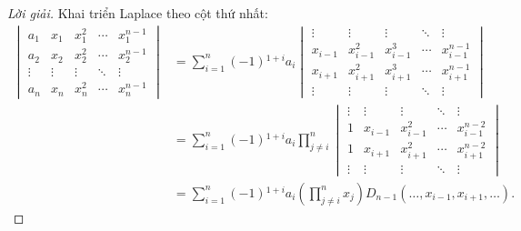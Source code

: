 \begin{proof}[Lời giải]
    Khai triển Laplace theo cột thứ nhất:
    \begin{align*}
        \begin{vmatrix}
            a_{1}  & x_{1}  & x_{1}^{2} & \cdots & x_{1}^{n-1} \\
            a_{2}  & x_{2}  & x_{2}^{2} & \cdots & x_{2}^{n-1} \\
            \vdots & \vdots & \vdots    & \ddots & \vdots      \\
            a_{n}  & x_{n}  & x_{n}^{2} & \cdots & x_{n}^{n-1}
        \end{vmatrix}
         & =
        \sum^{n}_{i=1}(-1){}^{1+i}a_{i}
        \begin{vmatrix}
            \vdots  & \vdots      & \vdots      & \ddots & \vdots        \\
            x_{i-1} & x_{i-1}^{2} & x_{i-1}^{3} & \cdots & x_{i-1}^{n-1} \\
            x_{i+1} & x_{i+1}^{2} & x_{i+1}^{3} & \cdots & x_{i+1}^{n-1} \\
            \vdots  & \vdots      & \vdots      & \ddots & \vdots
        \end{vmatrix} \\
         & =
        \sum^{n}_{i=1}(-1){}^{1+i}a_{i}\prod^{n}_{j\ne i}
        \begin{vmatrix}
            \vdots & \vdots  & \vdots      & \ddots & \vdots        \\
            1      & x_{i-1} & x_{i-1}^{2} & \cdots & x_{i-1}^{n-2} \\
            1      & x_{i+1} & x_{i+1}^{2} & \cdots & x_{i+1}^{n-2} \\
            \vdots & \vdots  & \vdots      & \ddots & \vdots
        \end{vmatrix}      \\
         & =
        \sum^{n}_{i=1}(-1){}^{1+i}a_{i}\left(\prod^{n}_{j\ne i}x_{j}\right)
        D_{n-1}(\ldots, x_{i-1}, x_{i+1}, \ldots).
    \end{align*}
\end{proof}

